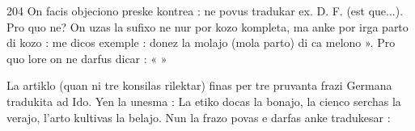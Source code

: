 \begin{VUpage}[208]{204}
On facis objeciono preske kontrea :  ne povus tradukar ex.\nl
D.  F.  (est que...).\nl
Pro quo ne? On uzas la sufixo  ne nur por kozo kompleta, ma\nl
anke por irga parto di kozo : me dicos exemple : donez la molajo\nl
(mola parto) di ca melono ». Pro quo lore on ne darfus dicar :\nl
«  »

La artiklo (quan ni tre konsilas rilektar) finas per tre pruvanta\nl
frazi Germana tradukita ad Ido. Yen la unesma : \nl
{}\nl
{} La etiko docas la bonajo, la cienco serchas la verajo, l'arto\nl
kultivas la belajo. Nun la frazo povas e darfas anke tradukesar :\nl
{}\nl
{}
\end{VUpage}

